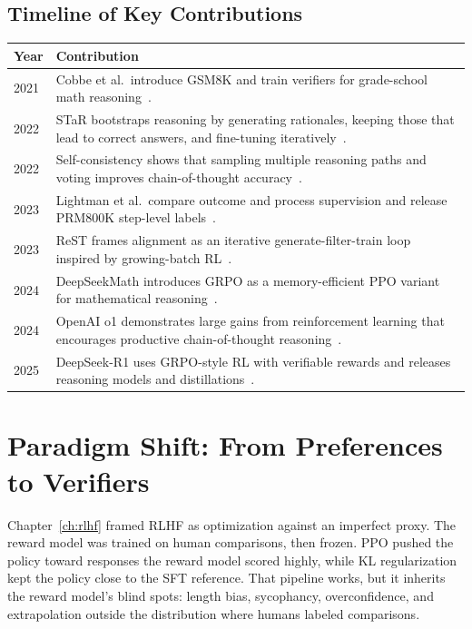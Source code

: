 \subsection*{Timeline of Key Contributions}

\begin{center}
\begin{tabular}{lp{11cm}}
\toprule
Year & Contribution \\
\midrule
2021 & Cobbe et al.\ introduce GSM8K and train verifiers for grade-school math reasoning~\cite{cobbe2021gsm8k}. \\
2022 & STaR bootstraps reasoning by generating rationales, keeping those that lead to correct answers, and fine-tuning iteratively~\cite{zelikman2022star}. \\
2022 & Self-consistency shows that sampling multiple reasoning paths and voting improves chain-of-thought accuracy~\cite{wang2022selfconsistency}. \\
2023 & Lightman et al.\ compare outcome and process supervision and release PRM800K step-level labels~\cite{lightman2023verify}. \\
2023 & ReST frames alignment as an iterative generate-filter-train loop inspired by growing-batch RL~\cite{gulcehre2023rest}. \\
2024 & DeepSeekMath introduces GRPO as a memory-efficient PPO variant for mathematical reasoning~\cite{shao2024deepseekmath}. \\
2024 & OpenAI o1 demonstrates large gains from reinforcement learning that encourages productive chain-of-thought reasoning~\cite{openai2024reasoning}. \\
2025 & DeepSeek-R1 uses GRPO-style RL with verifiable rewards and releases reasoning models and distillations~\cite{deepseekai2025r1}. \\
\bottomrule
\end{tabular}
\end{center}


\section{Paradigm Shift: From Preferences to Verifiers}
\label{sec:rlvr-shift}

Chapter~\ref{ch:rlhf} framed RLHF as optimization against an imperfect proxy. The reward model was trained on human comparisons, then frozen. PPO pushed the policy toward responses the reward model scored highly, while KL regularization kept the policy close to the SFT reference. That pipeline works, but it inherits the reward model's blind spots: length bias, sycophancy, overconfidence, and extrapolation outside the distribution where humans labeled comparisons.

